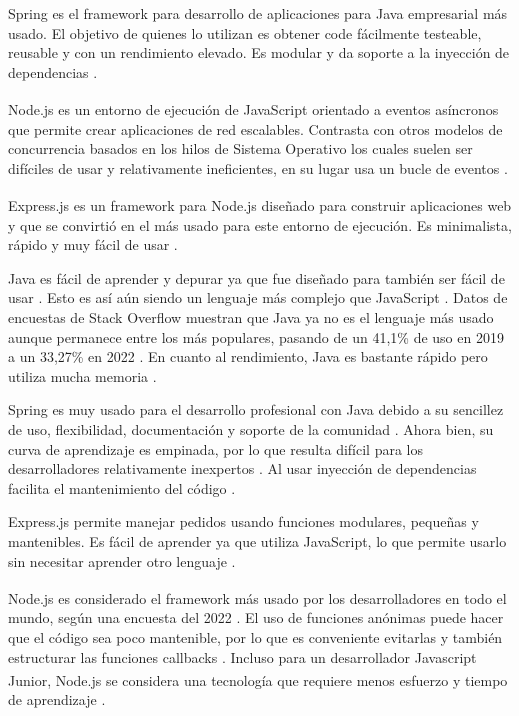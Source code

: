 \documentclass{article}
\begin{document}
Spring es el framework para desarrollo de aplicaciones para Java empresarial más usado. El objetivo de quienes lo utilizan es obtener code fácilmente testeable, reusable y con un rendimiento elevado. Es modular y da soporte a la inyección de dependencias \parencite{tutorialspointSpring}.

Node.js\textsuperscript{\textregistered} es un entorno de ejecución de JavaScript orientado a eventos asíncronos que permite crear aplicaciones de red escalables. Contrasta con otros modelos de concurrencia basados en los hilos de Sistema Operativo los cuales suelen ser difíciles de usar y relativamente ineficientes, en su lugar usa un bucle de eventos \parencite{aboutNode}.

Express.js es un framework para Node.js\textsuperscript{\textregistered} diseñado para construir aplicaciones web y que se convirtió en el más usado para este entorno de ejecución. Es minimalista, rápido y muy fácil de usar \parencite{kinstaExpress}.

Java es fácil de aprender y depurar ya que fue diseñado para también ser fácil de usar \parencite{ibmJava}. Esto es así aún siendo un lenguaje más complejo que JavaScript \parencite{lighthouselabsJavaVSJavscript}. Datos de encuestas de Stack Overflow muestran que Java ya no es el lenguaje más usado aunque permanece entre los más populares, pasando de un 41,1\% de uso en 2019 a un 33,27\% en 2022 \parencite{devmJava}. En cuanto al rendimiento, Java es bastante rápido pero utiliza mucha memoria \parencite{akkiJava}.

Spring es muy usado para el desarrollo profesional con Java debido a su sencillez de uso, flexibilidad, documentación y soporte de la comunidad \parencite{flexipleJava}. Ahora bien, su curva de aprendizaje es empinada, por lo que resulta difícil para los desarrolladores relativamente inexpertos \parencite{adservio}. Al usar inyección de dependencias facilita el mantenimiento del código \parencite{turingSpring}.

Express.js permite manejar pedidos usando funciones modulares, pequeñas y mantenibles. Es fácil de aprender ya que utiliza JavaScript, lo que permite usarlo sin necesitar aprender otro lenguaje \parencite{linuxhintExpress}. 

Node.js\textsuperscript{\textregistered} es considerado el framework más usado por los desarrolladores en todo el mundo, según una encuesta del 2022 \parencite{statistaFrameworks}. El uso de funciones anónimas puede hacer que el código sea poco mantenible, por lo que es conveniente evitarlas y también estructurar las funciones callbacks \parencite{packtpub}. Incluso para un desarrollador Javascript Junior, Node.js\textsuperscript{\textregistered} se considera una tecnología que requiere menos esfuerzo y tiempo de aprendizaje \parencite{simplilearnNode}.
\end{document}

